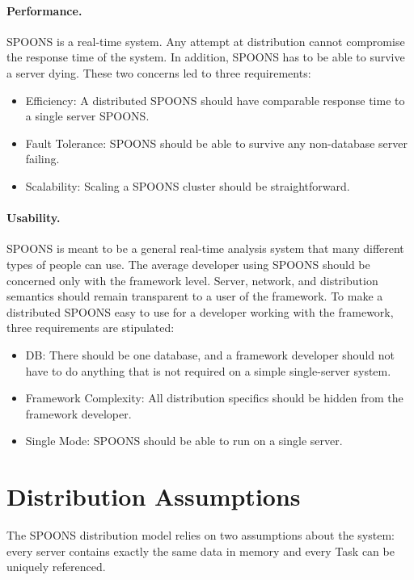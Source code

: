 \documentclass[12pt]{ucthesis}
\begin{document}
\paragraph{Performance.}
SPOONS is a real-time system. Any attempt at distribution cannot compromise the response time of the system.
In addition, SPOONS has to be able to survive a server dying. These two concerns led to three requirements:

\begin{itemize}
   \item Efficiency: A distributed SPOONS should have comparable response time to a single server SPOONS.
   \item Fault Tolerance: SPOONS should be able to survive any non-database server failing.
   \item Scalability: Scaling a SPOONS cluster should be straightforward.
\end{itemize}

\paragraph{Usability.}
SPOONS is meant to be a general real-time analysis system that many different types of people can use.
The average developer using SPOONS should be concerned only with the framework level.
Server, network, and distribution semantics should remain transparent to a user of the framework.
To make a distributed SPOONS easy to use for a developer working with the framework, three requirements
are stipulated:

\begin{itemize}
   \item DB: There should be one database, and a framework developer should not have to do anything that is not required on a simple single-server system.
   \item Framework Complexity: All distribution specifics should be hidden from the framework developer.
   \item Single Mode: SPOONS should be able to run on a single server.
\end{itemize}

\section{Distribution Assumptions}
\label{arch-dist-assumptions}
The SPOONS distribution model relies on two assumptions about the system: every server contains
exactly the same data in memory and every Task can be uniquely referenced.
\end{document}
